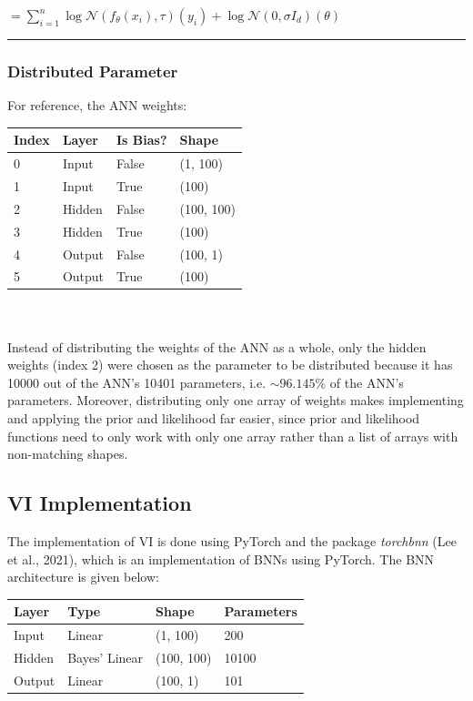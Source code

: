 \documentclass[conference]{IEEEtran}
\begin{document}
$\displaystyle = \sum_{i=1}^n \log \mathcal{N}(f_\theta(x_i), \tau)(y_i) + \log \mathcal{N}(0, \sigma I_d)(\theta)$\\

\par\noindent\rule{0.49\textwidth}{0.1pt}

\subsubsection{Distributed Parameter}
For reference, the ANN weights:\\

\begin{tabular}{| m{1.5cm} | m{1.5cm} | m{1.5cm} | m{1.5cm} |}
    \hline
    \textbf{Index} & \textbf{Layer} & \textbf{Is Bias?}& \textbf{Shape}\\
    \hline
    0 & Input & False & (1, 100)\\
    \hline
    1 & Input & True & (100)\\
    \hline
    2 & Hidden & False & (100, 100)\\
    \hline
    3 & Hidden & True & (100)\\
    \hline
    4 & Output & False & (100, 1)\\
    \hline
    5 & Output & True & (100)\\
    \hline
\end{tabular}\\~\\

Instead of distributing the weights of the ANN as a whole, only the hidden weights (index 2) were chosen as the parameter to be distributed because it has 10000 out of the ANN's 10401 parameters, i.e. $\sim 96.145\%$ of the ANN's parameters. Moreover, distributing only one array of weights makes implementing and applying the prior and likelihood far easier, since prior and likelihood functions need to only work with only one array rather than a list of arrays with non-matching shapes.\\

\subsection{VI Implementation}
The implementation of VI is done using PyTorch and the package \textit{torchbnn} (Lee et al., 2021), which is an implementation of BNNs using PyTorch. The BNN architecture is given below:\\

\begin{tabular}{| m{1cm} | m{2cm} | m{1.5cm} | m{2cm} |}
    \hline
    \textbf{Layer} & \textbf{Type} & \textbf{Shape} & \textbf{Parameters}\\
    \hline
    Input & Linear & (1, 100) & 200\\
    \hline
    Hidden & Bayes' Linear & (100, 100) & 10100\\
    \hline
    Output & Linear & (100, 1) & 101\\
    \hline
\end{tabular}\\~\\
\end{document}
